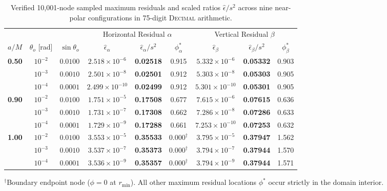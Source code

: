 \begin{table}[t]
\centering
\small
\caption{Verified 10,001-node sampled maximum residuals and scaled ratios $\hat{\epsilon}/s^2$ across nine near-polar configurations in 75-digit \textsc{Decimal} arithmetic.}
\label{tab:sampled_residuals_audit}
\vspace{2mm}
\setlength{\tabcolsep}{5pt}
\begin{tabular}{l c c c c c c c c}
\toprule
& & & \multicolumn{3}{c}{Horizontal Residual $\alpha$} & \multicolumn{3}{c}{Vertical Residual $\beta$} \\
\cmidrule(lr){4-6} \cmidrule(lr){7-9}
$a/M$ & $\theta_o$ [rad] & $\sin\theta_o$ & $\hat{\epsilon}_\alpha$ & $\hat{\epsilon}_\alpha / s^2$ & $\phi^*_\alpha$ & $\hat{\epsilon}_\beta$ & $\hat{\epsilon}_\beta / s^2$ & $\phi^*_\beta$ \\
\midrule
\multirow{3}{*}{\textbf{0.50}} 
& $10^{-2}$ & $0.0100$ & $2.518\times 10^{-6}$ & \textbf{0.02518} & 0.915 & $5.332\times 10^{-6}$ & \textbf{0.05332} & 0.903 \\
& $10^{-3}$ & $0.0010$ & $2.501\times 10^{-8}$ & \textbf{0.02501} & 0.912 & $5.303\times 10^{-8}$ & \textbf{0.05303} & 0.905 \\
& $10^{-4}$ & $0.0001$ & $2.499\times 10^{-10}$ & \textbf{0.02499} & 0.912 & $5.301\times 10^{-10}$ & \textbf{0.05301} & 0.905 \\
\midrule
\multirow{3}{*}{\textbf{0.90}} 
& $10^{-2}$ & $0.0100$ & $1.751\times 10^{-5}$ & \textbf{0.17508} & 0.677 & $7.615\times 10^{-6}$ & \textbf{0.07615} & 0.636 \\
& $10^{-3}$ & $0.0010$ & $1.731\times 10^{-7}$ & \textbf{0.17308} & 0.662 & $7.286\times 10^{-8}$ & \textbf{0.07286} & 0.633 \\
& $10^{-4}$ & $0.0001$ & $1.729\times 10^{-9}$ & \textbf{0.17288} & 0.661 & $7.253\times 10^{-10}$ & \textbf{0.07253} & 0.632 \\
\midrule
\multirow{3}{*}{\textbf{1.00}} 
& $10^{-2}$ & $0.0100$ & $3.553\times 10^{-5}$ & \textbf{0.35533} & $0.000^\dagger$ & $3.795\times 10^{-5}$ & \textbf{0.37947} & 1.562 \\
& $10^{-3}$ & $0.0010$ & $3.537\times 10^{-7}$ & \textbf{0.35373} & $0.000^\dagger$ & $3.794\times 10^{-7}$ & \textbf{0.37944} & 1.570 \\
& $10^{-4}$ & $0.0001$ & $3.536\times 10^{-9}$ & \textbf{0.35357} & $0.000^\dagger$ & $3.794\times 10^{-9}$ & \textbf{0.37944} & 1.571 \\
\bottomrule
\end{tabular}
\begin{flushleft}
\footnotesize
$^\dagger$Boundary endpoint node ($\phi = 0$ at $r_{\min}$). All other maximum residual locations $\phi^*$ occur strictly in the domain interior.
\end{flushleft}
\end{table}

